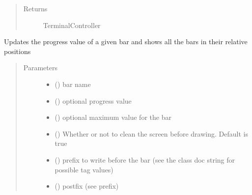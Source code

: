 \documentclass[a4paper,10pt,english]{sphinxmanual}
\begin{document}
\begin{fulllineitems}
\begin{fulllineitems}
\begin{quote}
\begin{description}
\item[{Returns}] \leavevmode
TerminalController

\end{description}\end{quote}

\end{fulllineitems}


\begin{fulllineitems}
\label{\detokenize{api/termtools.terminal.ProgressBarController:termtools.terminal.ProgressBarController.update}}
Updates the progress value of a given bar and shows all the bars in their relative positions
\begin{quote}\begin{description}
\item[{Parameters}] \leavevmode\begin{itemize}
\item {} 
 () \textendash{} bar name

\item {} 
 () \textendash{} optional progress value

\item {} 
 () \textendash{} optional maximum value for the bar

\item {} 
 () \textendash{} Whether or not to clean the screen before drawing. Default is true

\item {} 
 () \textendash{} prefix to write before the bar (see the class doc string for possible tag values)

\item {} 
 () \textendash{} postfix (see prefix)


\end{itemize}
\end{description}
\end{quote}
\end{fulllineitems}
\end{fulllineitems}
\end{document}
